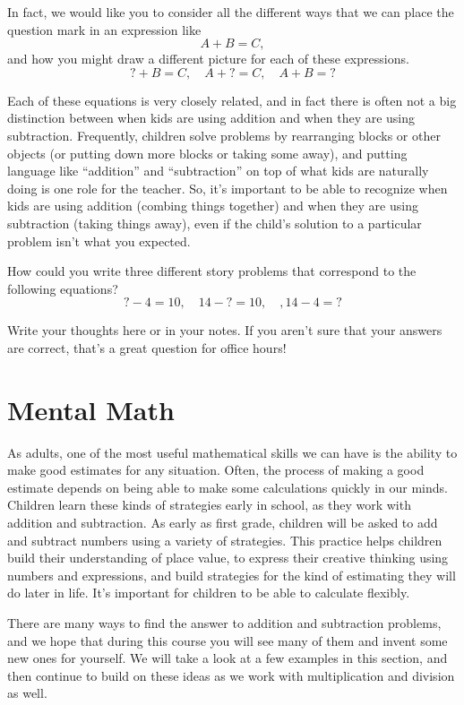 \documentclass{ximera}
\begin{document}
In fact, we would like you to consider all the different ways that we can place the question mark in an expression like
\[
A + B = C, 
\]
and how you might draw a different picture for each of these expressions.
\[
? + B = C, \quad A + ? = C, \quad A + B = ?
\]

Each of these equations is very closely related, and in fact there is often not a big distinction between when kids are using addition and when they are using subtraction. Frequently, children solve problems by rearranging blocks or other objects (or putting down more blocks or taking some away), and putting language like ``addition'' and ``subtraction'' on top of what kids are naturally doing is one role for the teacher. So, it's important to be able to recognize when kids are using addition (combing things together) and when they are using subtraction (taking things away), even if the child's solution to a particular problem isn't what you expected.

\begin{question}
How could you write three different story problems that correspond to the following equations?
\[
? - 4 = 10, \quad 14 - ? = 10, \quad, 14-4=?
\]
\begin{freeResponse}
Write your thoughts here or in your notes. If you aren't sure that your answers are correct, that's a great question for office hours!
\end{freeResponse}
\end{question}



\section{Mental Math}

As adults, one of the most useful mathematical skills we can have is the ability to make good estimates for any situation. Often, the process of making a good estimate depends on being able to make some calculations quickly in our minds. Children learn these kinds of strategies early in school, as they work with addition and subtraction. As early as first grade, children will be asked to add and subtract numbers using a variety of strategies. This practice helps children build their understanding of place value, to express their creative thinking using numbers and expressions, and build strategies for the kind of estimating they will do later in life. It's important for children to be able to calculate flexibly.

There are many ways to find the answer to addition and subtraction problems, and we hope that during this course you will see many of them and invent some new ones for yourself. We will take a look at a few examples in this section, and then continue to build on these ideas as we work with multiplication and division as well. 
\end{document}
